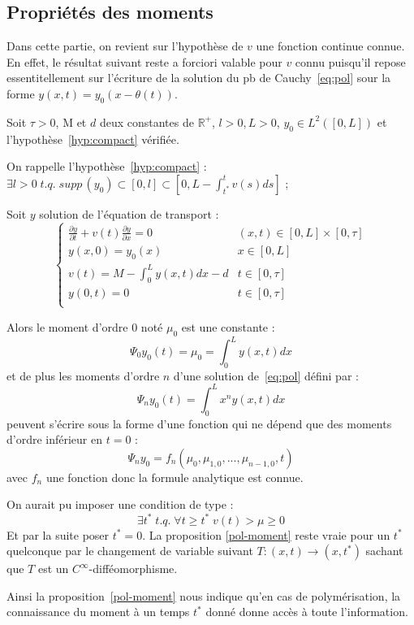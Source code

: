 \documentclass[a4paper]{article}
\newcommand{\mass}{\mathrm{M}}
\newcommand{\dep}{d}
\begin{document}
\subsection{Propriétés des moments}

Dans cette partie, on revient sur l'hypothèse de $v$ une fonction continue connue.
En effet, le résultat suivant reste a forciori valable pour $v$ connu puisqu'il repose essentitellement sur l'écriture de la solution du pb de Cauchy~\eqref{eq:pol} sour la forme $y(x,t)=y_0(x-\theta(t))$.

\begin{proposition}
	\label{pol-moment}
	Soit $\tau>0$, $\mass$ et $\dep$ deux constantes de $\mathbb{R}^+$, 
	$l>0, L>0$, $y_0 \in L^2([0,L])$ et l'hypothèse~\eqref{hyp:compact} vérifiée.
	
	On rappelle l'hypothèse~\eqref{hyp:compact} :
     $\exists l>0 \; t.q. \; supp \, (y_{0}) \subset [0,l]\subset [0,L-\int_{t^*}^t v(s)ds]$ ;
	
	Soit $y$ solution de l'équation de transport :
	\begin{equation}
		\label{eq:pol-moment}
		\begin{cases}
			\displaystyle \frac{\partial y}{\partial t}+ v(t) \frac{\partial y} {\partial x}  = 0 & (x,t) \in [0,L] \times [0, \tau] \\
             y(x,0) = y_{0} (x) & x \in [0,L] \\
			 v(t) = M - \int_0^L y(x,t)dx - \dep & t \in [0,\tau]\\
			 y(0,t) = 0 & t \in [0,\tau]\\
		\end{cases}
	\end{equation}
	
	
	Alors le moment d'ordre 0 noté $\mu_0$ est une constante :
	\[\Psi_0 y_0 (t) = \mu_0 = \int_0^L y(x,t) dx \]
	et de plus les moments d'ordre $n$ d'une solution de~\eqref{eq:pol} défini par :
	\[\Psi_n y_0 (t) = \int_0^L x^n y(x,t) dx \]
	peuvent s'écrire sous la forme d'une fonction qui ne dépend que des moments d'ordre inférieur en $t=0$ :
	\[\Psi_n y_0 = f_n (\mu_{0},\mu_{1,0},..., \mu_{n-1,0},t)\]
	avec $f_n$ une fonction donc la formule analytique est connue.
\end{proposition}



\begin{remarque} 
On aurait pu imposer une condition de type :
\[\exists t^* \; t.q. \; \forall t \geq t^* \; v(t) > \mu \geq 0 \]
Et par la suite poser $t^* = 0$. 
La proposition \ref{pol-moment} reste vraie pour un $t^*$ quelconque par le changement de variable suivant $T: (x,t) \to (x,t^*)$ sachant que $T$ est un $C^\infty$-difféomorphisme.

Ainsi la proposition~\ref{pol-moment} nous indique qu'en cas de polymérisation, 
la connaissance du moment à un temps $t^*$ donné donne accès à toute l'information.
\end{remarque}
\end{document}
